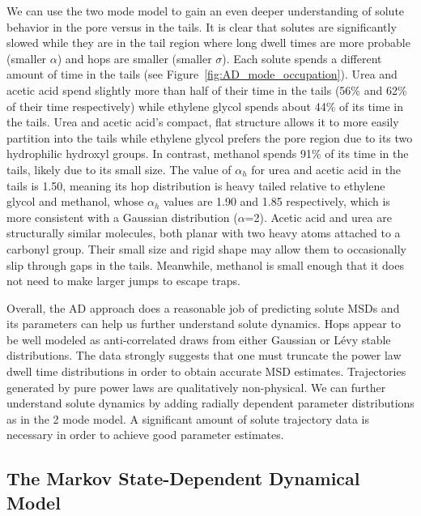 \documentclass[journal=jctcce,manuscript=article]{achemso}
\begin{document}
  We can use the two mode model to gain an even deeper understanding of solute
  behavior in the pore versus in the tails. It is clear that solutes are
  significantly slowed while they are in the tail region where long dwell times
  are more probable (smaller $\alpha$) and hops are smaller (smaller $\sigma$).
  Each solute spends a different amount of time in the tails (see
  Figure~\ref{fig:AD_mode_occupation}). Urea and acetic acid spend slightly
  more than half of their time in the tails (56\% and 62\% of their time
  respectively) while ethylene glycol spends about 44\% of its time in the
  tails. Urea and acetic acid's compact, flat structure allows it to more
  easily partition into the tails while ethylene glycol prefers the pore region
  due to its two hydrophilic hydroxyl groups. In contrast, methanol spends 91\%
  of its time in the tails, likely due to its small size. The value of
  $\alpha_h$ for urea and acetic acid in the tails is 1.50, meaning its hop
  distribution is heavy tailed relative to ethylene glycol and methanol, whose
  $\alpha_h$ values are 1.90 and 1.85 respectively, which is more consistent
  with a Gaussian distribution ($\alpha$=2). Acetic acid and urea are
  structurally similar molecules, both planar with two heavy atoms attached to
  a carbonyl group. Their small size and rigid shape may allow them to
  occasionally slip through gaps in the tails. Meanwhile, methanol is small
  enough that it does not need to make larger jumps to escape traps.

  Overall, the AD approach does a reasonable job of predicting solute MSDs and
  its parameters can help us further understand solute dynamics. Hops appear to
  be well modeled as anti-correlated draws from either Gaussian or L\'evy
  stable distributions. The data strongly suggests that one must truncate the
  power law dwell time distributions in order to obtain accurate MSD estimates.
  Trajectories generated by pure power laws are qualitatively non-physical. We
  can further understand solute dynamics by adding radially dependent parameter
  distributions as in the 2 mode model. A significant amount of solute
  trajectory data is necessary in order to achieve good parameter estimates. 

  \subsection{The Markov State-Dependent Dynamical Model}\label{section:msm_results}
  
\end{document}
